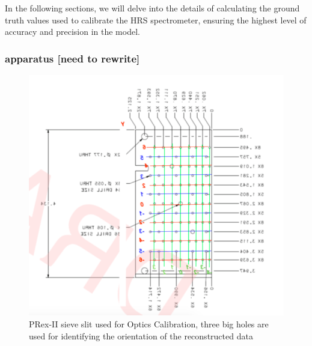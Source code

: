 In the following sections, we will delve into the details of calculating the ground truth values used to calibrate the HRS spectrometer, ensuring the highest level of accuracy and precision in the model.

\subsubsection{apparatus [need to rewrite]}

\begin{figure}
    \centering
    \includegraphics[width =\textwidth]{images/chap4/sieve_cnc_draw.png}
    \caption{PRex-II sieve slit used for Optics Calibration, three big holes are used for identifying the orientation of the reconstructed data}
    \label{fig:sieve_cnc_draw}
\end{figure}


